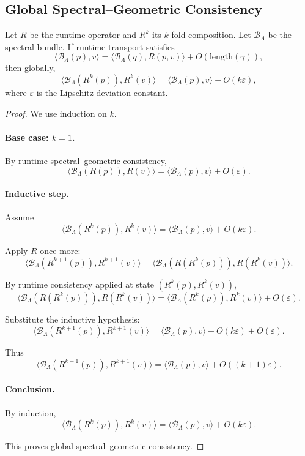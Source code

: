 \subsection{Global Spectral--Geometric Consistency}

\begin{lemma}
Let $R$ be the runtime operator and $R^k$ its $k$-fold composition.
Let $\mathcal{B}_\Lambda$ be the spectral bundle.  
If runtime transport satisfies
\[
\langle \mathcal{B}_\Lambda(p), v \rangle
=
\langle \mathcal{B}_\Lambda(q), R(p,v) \rangle
+ O(\mathrm{length}(\gamma)),
\]
then globally,
\[
\langle \mathcal{B}_\Lambda(R^k(p)), R^k(v) \rangle
=
\langle \mathcal{B}_\Lambda(p), v \rangle
+ O(k\varepsilon),
\]
where $\varepsilon$ is the Lipschitz deviation constant.
\end{lemma}

\begin{proof}
We use induction on $k$.

\paragraph{Base case: $k = 1$.}
By runtime spectral--geometric consistency,
\[
\langle \mathcal{B}_\Lambda(R(p)), R(v) \rangle
=
\langle \mathcal{B}_\Lambda(p), v \rangle
+ O(\varepsilon).
\]

\paragraph{Inductive step.}
Assume
\[
\langle \mathcal{B}_\Lambda(R^k(p)), R^k(v) \rangle
=
\langle \mathcal{B}_\Lambda(p), v \rangle
+ O(k\varepsilon).
\]

Apply $R$ once more:
\[
\langle \mathcal{B}_\Lambda(R^{k+1}(p)), R^{k+1}(v) \rangle
=
\langle \mathcal{B}_\Lambda(R(R^k(p))), R(R^k(v)) \rangle.
\]

By runtime consistency applied at state $(R^k(p), R^k(v))$,
\[
\langle \mathcal{B}_\Lambda(R(R^k(p))), R(R^k(v)) \rangle
=
\langle \mathcal{B}_\Lambda(R^k(p)), R^k(v) \rangle
+ O(\varepsilon).
\]

Substitute the inductive hypothesis:
\[
\langle \mathcal{B}_\Lambda(R^{k+1}(p)), R^{k+1}(v) \rangle
=
\langle \mathcal{B}_\Lambda(p), v \rangle
+ O(k\varepsilon)
+ O(\varepsilon).
\]

Thus
\[
\langle \mathcal{B}_\Lambda(R^{k+1}(p)), R^{k+1}(v) \rangle
=
\langle \mathcal{B}_\Lambda(p), v \rangle
+ O((k+1)\varepsilon).
\]

\paragraph{Conclusion.}
By induction,
\[
\langle \mathcal{B}_\Lambda(R^k(p)), R^k(v) \rangle
=
\langle \mathcal{B}_\Lambda(p), v \rangle
+ O(k\varepsilon).
\]

This proves global spectral--geometric consistency.
\end{proof}

